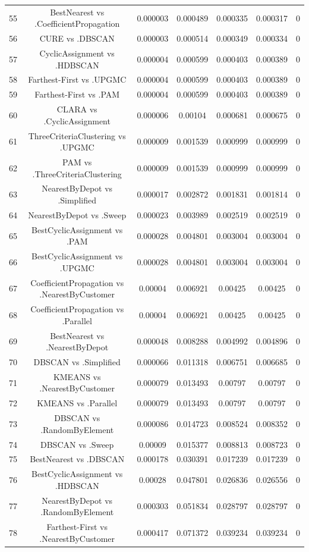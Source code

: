 \documentclass[a4paper,10pt]{article}
\begin{document}
\begin{landscape}
\begin{table}[!htp]
\begin{tabular}{ccccccc}
55&BestNearest vs .CoefficientPropagation&0.000003&0.000489&0.000335&0.000317&0\\
56&CURE vs .DBSCAN&0.000003&0.000514&0.000349&0.000334&0\\
57&CyclicAssignment vs .HDBSCAN&0.000004&0.000599&0.000403&0.000389&0\\
58&Farthest-First vs .UPGMC&0.000004&0.000599&0.000403&0.000389&0\\
59&Farthest-First vs .PAM&0.000004&0.000599&0.000403&0.000389&0\\
60&CLARA vs .CyclicAssignment&0.000006&0.00104&0.000681&0.000675&0\\
61&ThreeCriteriaClustering vs .UPGMC&0.000009&0.001539&0.000999&0.000999&0\\
62&PAM vs .ThreeCriteriaClustering&0.000009&0.001539&0.000999&0.000999&0\\
63&NearestByDepot vs .Simplified&0.000017&0.002872&0.001831&0.001814&0\\
64&NearestByDepot vs .Sweep&0.000023&0.003989&0.002519&0.002519&0\\
65&BestCyclicAssignment vs .PAM&0.000028&0.004801&0.003004&0.003004&0\\
66&BestCyclicAssignment vs .UPGMC&0.000028&0.004801&0.003004&0.003004&0\\
67&CoefficientPropagation vs .NearestByCustomer&0.00004&0.006921&0.00425&0.00425&0\\
68&CoefficientPropagation vs .Parallel&0.00004&0.006921&0.00425&0.00425&0\\
69&BestNearest vs .NearestByDepot&0.000048&0.008288&0.004992&0.004896&0\\
70&DBSCAN vs .Simplified&0.000066&0.011318&0.006751&0.006685&0\\
71&KMEANS vs .NearestByCustomer&0.000079&0.013493&0.00797&0.00797&0\\
72&KMEANS vs .Parallel&0.000079&0.013493&0.00797&0.00797&0\\
73&DBSCAN vs .RandomByElement&0.000086&0.014723&0.008524&0.008352&0\\
74&DBSCAN vs .Sweep&0.00009&0.015377&0.008813&0.008723&0\\
75&BestNearest vs .DBSCAN&0.000178&0.030391&0.017239&0.017239&0\\
76&BestCyclicAssignment vs .HDBSCAN&0.00028&0.047801&0.026836&0.026556&0\\
77&NearestByDepot vs .RandomByElement&0.000303&0.051834&0.028797&0.028797&0\\
78&Farthest-First vs .NearestByCustomer&0.000417&0.071372&0.039234&0.039234&0\\

\end{tabular}
\end{table}
\end{landscape}
\end{document}
